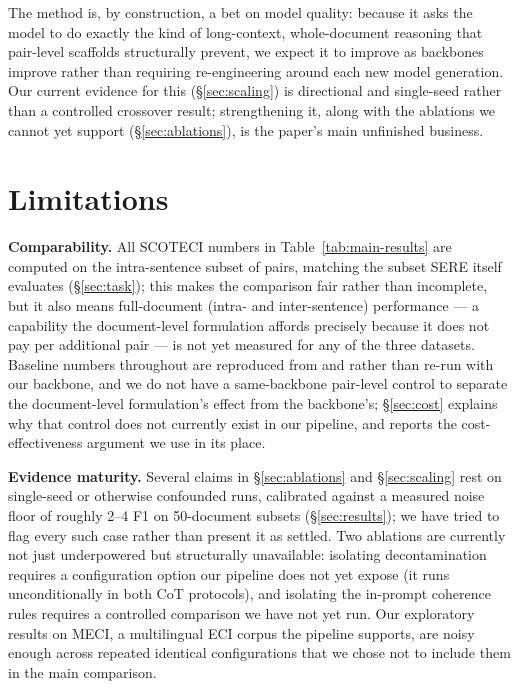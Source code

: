 \documentclass[11pt]{article}
\newcommand{\method}{SCOTECI}
\begin{document}
The method is, by construction, a bet on model quality: because it asks the model
to do exactly the kind of long-context, whole-document reasoning that pair-level
scaffolds structurally prevent, we expect it to improve as backbones improve
rather than requiring re-engineering around each new model generation. Our current
evidence for this (\S\ref{sec:scaling}) is directional and single-seed rather than
a controlled crossover result; strengthening it, along with the ablations we
cannot yet support (\S\ref{sec:ablations}), is the paper's main unfinished
business.

\section*{Limitations}

\textbf{Comparability.} All \method{} numbers in Table~\ref{tab:main-results} are
computed on the intra-sentence subset of pairs, matching the subset SERE itself
evaluates (\S\ref{sec:task}); this makes the comparison fair rather than
incomplete, but it also means full-document (intra- and inter-sentence)
performance --- a capability the document-level formulation affords precisely
because it does not pay per additional pair --- is not yet measured for any of the
three datasets. Baseline numbers throughout are reproduced from
\citet{hao2026sere} and \citet{cai2025dreci} rather than re-run with our backbone,
and we do not have a same-backbone pair-level control to separate the
document-level formulation's effect from the backbone's; \S\ref{sec:cost} explains
why that control does not currently exist in our pipeline, and reports the
cost-effectiveness argument we use in its place.

\textbf{Evidence maturity.} Several claims in \S\ref{sec:ablations} and
\S\ref{sec:scaling} rest on single-seed or otherwise confounded runs, calibrated
against a measured noise floor of roughly 2--4 F1 on 50-document subsets
(\S\ref{sec:results}); we have tried to flag every such case rather than present
it as settled. Two ablations are currently not just underpowered but structurally
unavailable: isolating decontamination requires a configuration option our
pipeline does not yet expose (it runs unconditionally in both CoT protocols), and
isolating the in-prompt coherence rules requires a controlled comparison we have
not yet run. Our exploratory results on MECI, a multilingual ECI corpus the
pipeline supports, are noisy enough across repeated identical configurations that
we chose not to include them in the main comparison.
\end{document}
